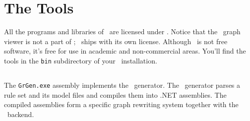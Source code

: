 \section{The Tools}

All the programs and libraries of \GrG\ are licensed under .
Notice that the \yComp\ graph viewer is not a part of \GrG ; \yComp\ ships with its own license.
Although \yComp\ is not free software, it's free for use in academic and non-commercial areas.
You'll find the tools in the \texttt{bin} subdirectory of your \GrG\ installation.


\subsection{\texttt{}} \label{grgenoptions}

\noindent The \texttt{GrGen.exe} assembly implements the \GrG\ generator.
The \GrG\ generator parses a rule set and its model files and compiles them into .NET assemblies.
The compiled assemblies form a specific graph rewriting system together with the \GrG\ backend.

